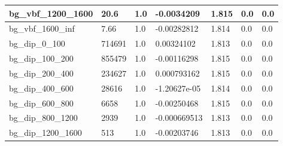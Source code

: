 \documentclass[a4paper, 10pt]{article}
\begin{document}
\begin{table}[H]
\begin{center}
\begin{tabular}{|m{23.0mm}|m{23.0mm}|m{18.0mm}|m{19.0mm}|m{19.0mm}|m{19.0mm}|m{19.0mm}|}
      \hline
      {\cellcolor{white}         bg\_vbf\_1200\_1600}& {\cellcolor{white}         20.6}& {\cellcolor{white}         1.0}& {\cellcolor{white}         -0.0034209}& {\cellcolor{white}         1.815}& {\cellcolor{green}         0.0}& {\cellcolor{green}         0.0}\\
      \hline
      {\cellcolor{white}         bg\_vbf\_1600\_inf}& {\cellcolor{white}         7.66}& {\cellcolor{white}         1.0}& {\cellcolor{white}         -0.00282812}& {\cellcolor{white}         1.814}& {\cellcolor{green}         0.0}& {\cellcolor{green}         0.0}\\
      \hline
      {\cellcolor{white}         bg\_dip\_0\_100}& {\cellcolor{white}         714691}& {\cellcolor{white}         1.0}& {\cellcolor{white}         0.00324102}& {\cellcolor{white}         1.813}& {\cellcolor{green}         0.0}& {\cellcolor{green}         0.0}\\
      \hline
      {\cellcolor{white}         bg\_dip\_100\_200}& {\cellcolor{white}         855479}& {\cellcolor{white}         1.0}& {\cellcolor{white}         -0.00116298}& {\cellcolor{white}         1.815}& {\cellcolor{green}         0.0}& {\cellcolor{green}         0.0}\\
      \hline
      {\cellcolor{white}         bg\_dip\_200\_400}& {\cellcolor{white}         234627}& {\cellcolor{white}         1.0}& {\cellcolor{white}         0.000793162}& {\cellcolor{white}         1.815}& {\cellcolor{green}         0.0}& {\cellcolor{green}         0.0}\\
      \hline
      {\cellcolor{white}         bg\_dip\_400\_600}& {\cellcolor{white}         28616}& {\cellcolor{white}         1.0}& {\cellcolor{white}         -1.20627e-05}& {\cellcolor{white}         1.814}& {\cellcolor{green}         0.0}& {\cellcolor{green}         0.0}\\
      \hline
      {\cellcolor{white}         bg\_dip\_600\_800}& {\cellcolor{white}         6658}& {\cellcolor{white}         1.0}& {\cellcolor{white}         -0.00250468}& {\cellcolor{white}         1.815}& {\cellcolor{green}         0.0}& {\cellcolor{green}         0.0}\\
      \hline
      {\cellcolor{white}         bg\_dip\_800\_1200}& {\cellcolor{white}         2939}& {\cellcolor{white}         1.0}& {\cellcolor{white}         -0.000669513}& {\cellcolor{white}         1.813}& {\cellcolor{green}         0.0}& {\cellcolor{green}         0.0}\\
      \hline
      {\cellcolor{white}         bg\_dip\_1200\_1600}& {\cellcolor{white}         513}& {\cellcolor{white}         1.0}& {\cellcolor{white}         -0.00203746}& {\cellcolor{white}         1.813}& {\cellcolor{green}         0.0}& {\cellcolor{green}         0.0}\\

\end{tabular}
\end{center}
\end{table}
\end{document}
